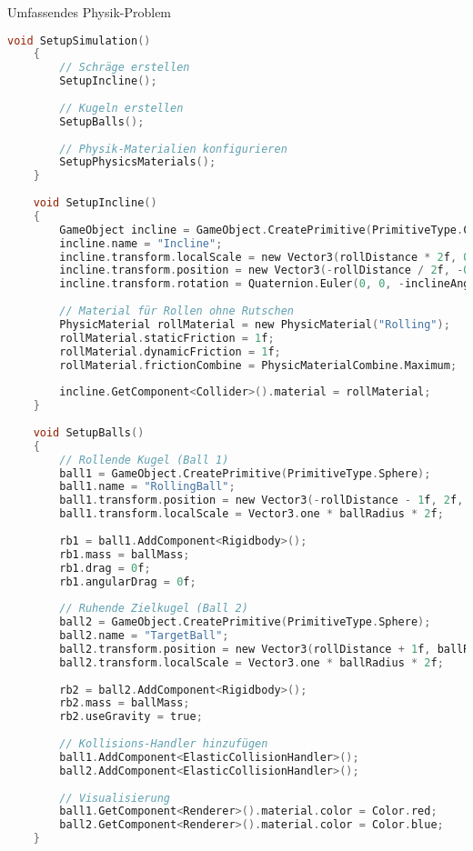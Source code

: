 \begin{example2}{Umfassendes Physik-Problem}
\begin{lstlisting}[language=C, style=basesmol]
    void SetupSimulation() 
    {
        // Schräge erstellen
        SetupIncline();
        
        // Kugeln erstellen
        SetupBalls();
        
        // Physik-Materialien konfigurieren
        SetupPhysicsMaterials();
    }
    
    void SetupIncline() 
    {
        GameObject incline = GameObject.CreatePrimitive(PrimitiveType.Cube);
        incline.name = "Incline";
        incline.transform.localScale = new Vector3(rollDistance * 2f, 0.1f, 1f);
        incline.transform.position = new Vector3(-rollDistance / 2f, -0.5f, 0);
        incline.transform.rotation = Quaternion.Euler(0, 0, -inclineAngle);
        
        // Material für Rollen ohne Rutschen
        PhysicMaterial rollMaterial = new PhysicMaterial("Rolling");
        rollMaterial.staticFriction = 1f;
        rollMaterial.dynamicFriction = 1f;
        rollMaterial.frictionCombine = PhysicMaterialCombine.Maximum;
        
        incline.GetComponent<Collider>().material = rollMaterial;
    }
    
    void SetupBalls() 
    {
        // Rollende Kugel (Ball 1)
        ball1 = GameObject.CreatePrimitive(PrimitiveType.Sphere);
        ball1.name = "RollingBall";
        ball1.transform.position = new Vector3(-rollDistance - 1f, 2f, 0);
        ball1.transform.localScale = Vector3.one * ballRadius * 2f;
        
        rb1 = ball1.AddComponent<Rigidbody>();
        rb1.mass = ballMass;
        rb1.drag = 0f;
        rb1.angularDrag = 0f;
        
        // Ruhende Zielkugel (Ball 2)
        ball2 = GameObject.CreatePrimitive(PrimitiveType.Sphere);
        ball2.name = "TargetBall";
        ball2.transform.position = new Vector3(rollDistance + 1f, ballRadius, 0);
        ball2.transform.localScale = Vector3.one * ballRadius * 2f;
        
        rb2 = ball2.AddComponent<Rigidbody>();
        rb2.mass = ballMass;
        rb2.useGravity = true;
        
        // Kollisions-Handler hinzufügen
        ball1.AddComponent<ElasticCollisionHandler>();
        ball2.AddComponent<ElasticCollisionHandler>();
        
        // Visualisierung
        ball1.GetComponent<Renderer>().material.color = Color.red;
        ball2.GetComponent<Renderer>().material.color = Color.blue;
    }
    

\end{lstlisting}
\end{example2}
